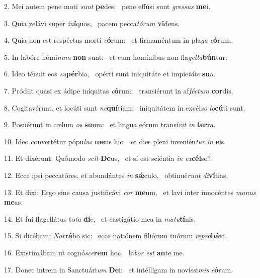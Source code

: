 2. Mei autem pene moti \textit{sunt} \textbf{pe}des: \ast\  pene effúsi sunt \textit{gres}\textit{sus} \textbf{me}i.\

3. Quia zelávi super \textit{in}\textbf{í}quos, \ast\  pacem pecca\textit{tó}\textit{rum} \textbf{vi}dens.\

4. Quia non est respéctus morti \textit{e}\textbf{ó}rum: \ast\  et firmaméntum in pla\textit{ga} \textit{e}\textbf{ó}rum.\

5. In labóre hómi\textit{num} \textbf{non} sunt: \ast\  et cum homínibus non fla\textit{gel}\textit{la}\textbf{bún}tur:\

6. Ideo ténuit eos \textit{su}\textbf{pér}bia, \ast\  opérti sunt iniquitáte et impie\textit{tá}\textit{te} \textbf{su}a.\

7. Pródiit quasi ex ádipe iníquitas \textit{e}\textbf{ó}rum: \ast\  transiérunt in af\textit{féc}\textit{tum} \textbf{cor}dis.\

8. Cogitavérunt, et locúti sunt \textit{ne}\textbf{quí}tiam: \ast\  iniquitátem in excél\textit{so} \textit{lo}\textbf{cú}ti sunt.\

9. Posuérunt in cælum \textit{os} \textbf{su}um: \ast\  et lingua eórum transí\textit{vit} \textit{in} \textbf{ter}ra.\

10. Ideo convertétur pópu\textit{lus} \textbf{me}us hic: \ast\  et dies pleni invenién\textit{tur} \textit{in} \textbf{e}is.\

11. Et dixérunt: Quómodo \textit{scit} \textbf{De}us, \ast\  et si est sciéntia \textit{in} \textit{ex}\textbf{cél}so?\

12. Ecce ipsi peccatóres, et abundántes \textit{in} \textbf{sǽ}culo, \ast\  obtinué\textit{runt} \textit{di}\textbf{ví}tias.\

13. Et dixi: Ergo sine causa justificávi \textit{cor} \textbf{me}um, \ast\  et lavi inter innocéntes \textit{ma}\textit{nus} \textbf{me}as.\

14. Et fui flagellátus to\textit{ta} \textbf{di}e, \ast\  et castigátio mea in \textit{ma}\textit{tu}\textbf{tí}nis.\

15. Si dicébam: \textit{Nar}\textbf{rá}bo sic: \ast\  ecce natiónem filiórum tuórum \textit{re}\textit{pro}\textbf{bá}vi.\

16. Existimábam ut cognó\textit{sce}\textbf{rem} hoc, \ast\  la\textit{bor} \textit{est} \textbf{an}te me.\

17. Donec intrem in Sanctuári\textit{um} \textbf{De}i: \ast\  et intélligam in novíssi\textit{mis} \textit{e}\textbf{ó}rum.\

